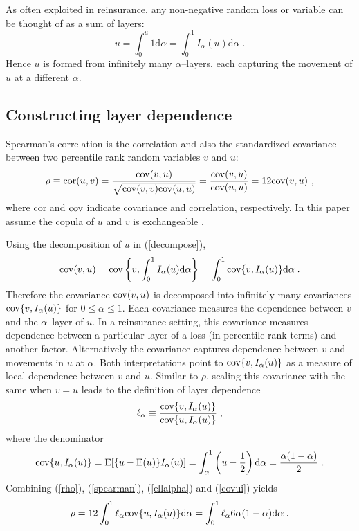 \documentclass[authoryear]{elsarticle}
\newcommand{\cov}{{\rm cov}}
\newcommand{\E}{{\mathrm E}}
\newcommand{\cor}{\mathrm{cor}}
\newcommand{\de}{\mathrm{d}}
\newcommand{\eref}[1]{(\ref{#1})}
\begin{document}
As often exploited  in reinsurance, any non-negative random loss or variable can be thought of as a sum of layers:
\begin{equation}\label{decompose}
u=\int_0^u 1\de \alpha= \int_0^1 I_\alpha(u)\de\alpha    \;.
\end{equation}
Hence $u$ is formed from infinitely many $\alpha$--layers, each capturing the movement of $u$ at a different $\alpha$.


\subsection{Constructing layer dependence}

Spearman's correlation is the correlation and also the standardized covariance between two percentile rank random variables $v$ and $u$:
\begin{equation}\label{rho}
\rho \equiv \cor(u,v) = \frac{\cov(v,u)}{\sqrt{\cov(v,v)\cov(u,u)}}=\frac{\cov(v,u)}{\cov(u,u)} = 12\cov(v,u)\ ,
\end{equation}
where $\cor$ and $\cov$ indicate covariance and correlation, respectively. In this paper assume the copula of $u$ and $v$ is exchangeable \citep{nelson1999ic}.

Using the decomposition of $u$ in \eref{decompose},
\begin{equation}\label{spearman}
\cov(v,u)=\cov\left\{v,\int_0^1I_\alpha(u)\de \alpha \right\}= \int_0^1 \cov\{v,I_\alpha(u)\} \de \alpha \; .
\end{equation}
Therefore the covariance $\cov(v,u)$ is decomposed into infinitely many covariances $\cov\{v,I_\alpha(u)\}$ for $0\le\alpha\le 1$. Each covariance measures the dependence between $v$ and the $\alpha$--layer of $u$. In a reinsurance setting, this covariance measures dependence between a particular layer of a loss (in percentile rank terms) and another factor. Alternatively the covariance captures dependence between $v$ and movements in $u$ at $\alpha$. Both interpretations point to $\cov\{v,I_\alpha(u)\}$ as a measure of local dependence between $v$ and $u$. Similar to $\rho$, scaling this covariance with the same when $v=u$ leads to the definition of layer dependence
\begin{equation}\label{ellalpha}
\ell_\alpha \equiv \frac{\cov\{v,I_\alpha(u)\}}{\cov\{u,I_\alpha(u)\}}   \;,
\end{equation}
where the denominator
\begin{equation}\label{covui}
\cov\{u,I_\alpha(u)\}=\E[\{u-\E(u)\}I_\alpha(u)]=\int_\alpha^1 \left(u  - \frac{1}{2}\right)\de \alpha = \frac{\alpha(1-\alpha)}{2}\ .
\end{equation}
Combining \eref{rho}, \eref{spearman}, \eref{ellalpha}  and \eref{covui} yields
\begin{equation}\label{wtdavg}
\rho = 12\int_0^1 \ell_\alpha \cov\{u,I_\alpha(u)\} \de \alpha =  \int_0^1 \ell_\alpha 6\alpha(1-\alpha) \de \alpha \; .
\end{equation}
\end{document}
